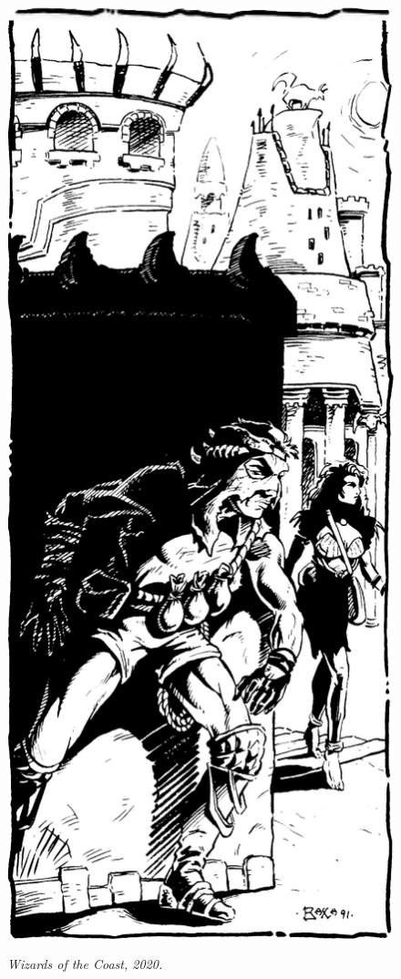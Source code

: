 \begin{figure}[t!]
\centering
\includegraphics[width=\columnwidth]{images/rogue-1.png}
\par\textit{\small\textcopyright Wizards of the Coast, 2020.}
\end{figure}

